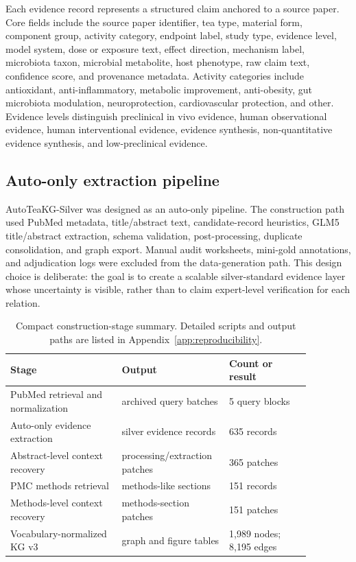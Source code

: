 \documentclass[11pt]{article}
\begin{document}
Each evidence record represents a structured claim anchored to a source paper. Core fields include the source paper identifier, tea type, material form, component group, activity category, endpoint label, study type, evidence level, model system, dose or exposure text, effect direction, mechanism label, microbiota taxon, microbial metabolite, host phenotype, raw claim text, confidence score, and provenance metadata. Activity categories include antioxidant, anti-inflammatory, metabolic improvement, anti-obesity, gut microbiota modulation, neuroprotection, cardiovascular protection, and other. Evidence levels distinguish preclinical in vivo evidence, human observational evidence, human interventional evidence, evidence synthesis, non-quantitative evidence synthesis, and low-preclinical evidence.

\subsection{Auto-only extraction pipeline}

AutoTeaKG-Silver was designed as an auto-only pipeline. The construction path used PubMed metadata, title/abstract text, candidate-record heuristics, GLM5 title/abstract extraction, schema validation, post-processing, duplicate consolidation, and graph export. Manual audit worksheets, mini-gold annotations, and adjudication logs were excluded from the data-generation path. This design choice is deliberate: the goal is to create a scalable silver-standard evidence layer whose uncertainty is visible, rather than to claim expert-level verification for each relation.

\begin{table}[t]
\centering
\small
\caption{Compact construction-stage summary. Detailed scripts and output paths are listed in Appendix~\ref{app:reproducibility}.}
\label{tab:pipeline_stages}
\begin{tabular}{p{0.34\linewidth}p{0.28\linewidth}p{0.25\linewidth}}
\toprule
Stage & Output & Count or result \\
\midrule
PubMed retrieval and normalization & archived query batches & 5 query blocks \\
Auto-only evidence extraction & silver evidence records & 635 records \\
Abstract-level context recovery & processing/extraction patches & 365 patches \\
PMC methods retrieval & methods-like sections & 151 records \\
Methods-level context recovery & methods-section patches & 151 patches \\
Vocabulary-normalized KG v3 & graph and figure tables & 1,989 nodes; 8,195 edges \\
\bottomrule
\end{tabular}
\end{table}
\end{document}
